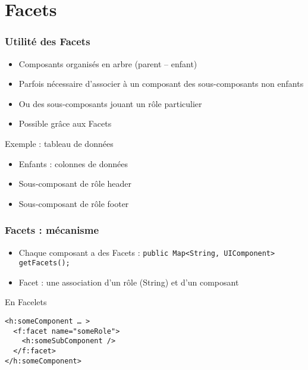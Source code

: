 \documentclass[english, french]{beamer}
\begin{document}
\section{Facets}
\begin{frame}
	\frametitle{Utilité des Facets}
	\begin{itemize}
		\item Composants organisés en arbre (parent – enfant)
		\item Parfois nécessaire d’associer à un composant des sous-composants non enfants
		\item Ou des sous-composants jouant un rôle particulier
		\item Possible grâce aux \og{}Facets\fg{}
	\end{itemize}
	\begin{exampleblock}{Exemple : tableau de données}
		\begin{itemize}
			\item Enfants : colonnes de données
			\item Sous-composant de rôle \og{}header\fg{}
			\item Sous-composant de rôle \og{}footer\fg{}
		\end{itemize}		
	\end{exampleblock}
\end{frame}

\begin{frame}[fragile]
	\frametitle{Facets : mécanisme}
	\begin{itemize}
		\item Chaque composant a des Facets : \texttt{public Map<String, UIComponent> getFacets();}
		\item Facet : une association d’un rôle (String) et d’un composant
	\end{itemize}
	\begin{block}{En Facelets}
		\begin{lstlisting}
<h:someComponent … >
  <f:facet name="someRole">
    <h:someSubComponent />
  </f:facet>
</h:someComponent>
		\end{lstlisting}
	\end{block}
\end{frame}
\end{document}
